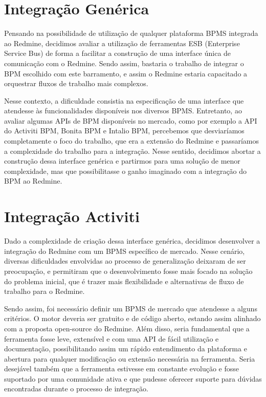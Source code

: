 \section{Integração Genérica}\label{sec:cenario-integracao-genérica}

Pensando na possibilidade de utilização de qualquer plataforma BPMS integrada ao Redmine, decidimos avaliar a utilização de ferramentas ESB (Enterprise Service Bus) de forma a facilitar a construção de uma interface única de comunicação com o Redmine. Sendo assim, bastaria o trabalho de integrar o BPM escolhido com este barramento, e assim o Redmine estaria capacitado a orquestrar fluxos de trabalho mais complexos.

Nesse contexto, a dificuldade consistia na especificação de uma interface que atendesse às funcionalidades disponíveis nos diversos BPMS. Entretanto, ao avaliar algumas APIs de BPM disponíveis no mercado, como por exemplo a API do Activiti BPM, Bonita BPM e Intalio BPM,  percebemos que desviaríamos completamente o foco do trabalho, que era a extensão do Redmine e passaríamos a complexidade do trabalho para a integração. Nesse sentido, decidimos abortar a construção dessa interface genérica e partirmos para uma solução de menor complexidade, mas que possibilitasse o ganho imaginado com a integração do BPM ao Redmine.

\section{Integração Activiti}\label{sec:cenario-integracao-activiti}

Dado a complexidade de criação dessa interface genérica, decidimos desenvolver a integração do Redmine com um BPMS específico de mercado. Nesse cenário, diversas dificuldades envolvidas ao processo de generalização deixaram de ser preocupação, e permitiram que o desenvolvimento fosse mais focado na solução do problema inicial, que é trazer mais flexibilidade e alternativas de fluxo de trabalho para o Redmine.

Sendo assim, foi necessário definir um BPMS de mercado que atendesse a alguns critérios. O motor deveria ser gratuito e de código aberto, estando assim alinhado com a proposta open-source do Redmine. Além disso, seria fundamental que a ferramenta fosse leve, extensível e com uma API de fácil utilização e documentação, possibilitando assim um rápido entendimento da plataforma e abertura para qualquer modificação ou extensão necessária na ferramenta. Seria desejável também que a ferramenta estivesse em constante evolução e fosse suportado por uma comunidade ativa e que pudesse oferecer suporte para dúvidas encontradas durante o processo de integração.

